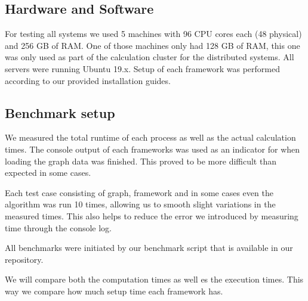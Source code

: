 
\subsection{Hardware and Software}
For testing all systems we used 5 machines with 96 CPU cores each (48 physical) and 256 GB of RAM. One of those machines only had 128 GB of RAM, this one was only used as part of the calculation cluster for the distributed systems.
All servers were running Ubuntu 19.x.
Setup of each framework was performed according to our provided installation guides.


\subsection{Benchmark setup}
We measured the total runtime of each process as well as the actual calculation times. The console output of each frameworks was used as an indicator for when loading the graph data was finished. This proved to be more difficult than expected in some cases.

Each test case consisting of graph, framework and in some cases even the algorithm was run 10 times, allowing us to smooth slight variations in the measured times. This also helps to reduce the error we introduced by measuring time through the console log.

All benchmarks were initiated by our benchmark script that is available in our repository.

We will compare both the computation times as well es the execution times. This way we compare how much setup time each framework has.
